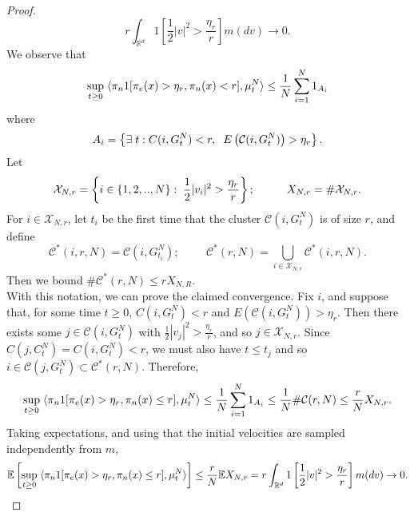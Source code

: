 \begin{proof}
\begin{equation}
    r\int_{\mathbb{R}^d}1\left[\frac{1}{2}|v|^2>\frac{\eta_r}{r}\right]m(dv)\rightarrow 0.
\end{equation}We observe that \begin{equation}
    \sup_{t\geq 0} \hspace{0.1cm} \langle \pi_n 1[\pi_e(x)>\eta_r, \pi_n(x)< r], \mu^N_t\rangle \leq \frac{1}{N}\sum_{i=1}^N 1_{A_i}  
\end{equation} where \begin{equation}
    A_i=\left\{\exists \hspace{0.1cm} t: C(i, G^N_t)< r, \hspace{0.2cm} E\left(\mathcal{C}(i, G^N_t)\right)> \eta_r \right\}.
\end{equation} Let \begin{equation}
    \mathcal{X}_{N,r}=\left\{i \in \{1,2,..,N\}: \hspace{0.1cm} \frac{1}{2}|v_i|^2>\frac{\eta_r}{r}\right\}; \hspace{1cm}X_{N,r}=\#\mathcal{X}_{N,r}.
\end{equation} For $i\in \mathcal{X}_{N,r}$, let $t_{i}$ be the first time that the cluster $\mathcal{C}(i, G^N_t)$ is of size $r$, and define \begin{equation}
    \mathcal{C}^*(i,r,N)=\mathcal{C}(i, G^N_{t_i});\hspace{1cm} \mathcal{C}^*(r,N)=\bigcup_{i\in \mathcal{X}_{N,r}} \mathcal{C}^*(i,r,N).
\end{equation} Then we bound $\#\mathcal{C}^*(r,N)\le r X_{N,R}$.  \medskip \\ With this notation, we can prove the claimed convergence. Fix $i$, and suppose that, for some time $t\geq 0$, $C(i, G^N_t)< r$ and $E(\mathcal{C}(i, G^N_t))> \eta_r.$ Then there exists some $j \in \mathcal{C}(i, G^N_t)$ with $\frac{1}{2}|v_j|^2 >\frac{\eta_r}{r}$, and so $j\in \mathcal{X}_{N,r}$. Since $C(j, C^N_t)=C(i, G^N_t)< r$, we must also have $t\le t_j$ and so $i\in\mathcal{C}(j,G^N_t) \subset \mathcal{C}^*(r,N).$ Therefore, \begin{equation}
    \sup_{t\geq 0} \hspace{0.1cm} \langle \pi_n 1[\pi_e(x)>\eta_r, \pi_n(x)\le r], \mu^N_t\rangle \le \frac{1}{N}\sum_{i=1}^N 1_{A_i} \le \frac{1}{N}\#\mathcal{C}(r,N) \le \frac{r}{N}X_{N,r}.
\end{equation} Taking expectations, and using that the initial velocities are sampled independently from $m$, \begin{equation} \begin{split}
    \mathbb{E}\left[\sup_{t\geq 0} \hspace{0.1cm} \langle \pi_n 1[\pi_e(x)>\eta_r, \pi_n(x)\le r], \mu^N_t\rangle\right] \le \frac{r}{N} \mathbb{E} X_{N,r}  = r\int_{\mathbb{R}^d} 1\left[\frac{1}{2}|v|^2>\frac{\eta_r}{r}\right]m(dv) \rightarrow 0. 
\end{split} \end{equation}\end{proof}

